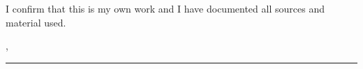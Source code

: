 \thispagestyle{empty}
\vspace*{0.7\textheight}
\noindent
I confirm that this \MakeLowercase{\worktype} is my own work and I have documented all sources and material used.

\vspace{15mm}
\noindent
\city, \submissionDate

\vspace{1.5cm}
\rule[-0.2cm]{5cm}{0.5pt}

\textsc{\authorname} 

\cleardoublepage{}
